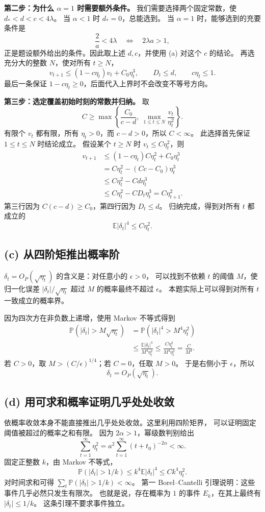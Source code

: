 \documentclass[UTF8,a4paper,11pt,fontset=fandol]{ctexart}
\newcommand{\E}{\mathbb E}
\newcommand{\Pp}{\mathbb P}
\begin{document}
\textbf{第二步：为什么 $\alpha=1$ 时需要额外条件。}
我们需要选择两个固定常数，使 $d_*<d<c<4\lambda$。
当 $\alpha<1$ 时 $d_*=0$，总能选到。
当 $\alpha=1$ 时，能够选到的充要条件是
\[
 \frac2a<4\lambda\quad\Longleftrightarrow\quad2\lambda a>1,
\]
正是题设额外给出的条件。因此取上述 $d,c$，并使用 (a) 对这个 $c$ 的结论。
再选充分大的整数 $N$，使对所有 $t\geq N$，
\[
 v_{t+1}\leq(1-c\eta_t)v_t+C_0\eta_t^3,
 \qquad D_t\leq d,\qquad c\eta_t\leq1.
\]
最后一条保证 $1-c\eta_t\geq0$，后面代入上界时不会改变不等号方向。

\textbf{第三步：选定覆盖初始时刻的常数并归纳。}
取
\[
 C\geq\max\left\{\frac{C_0}{c-d},\
                 \max_{1\leq t\leq N}\frac{v_t}{\eta_t^2}\right\}.
\]
有限个 $v_t$ 都有限，所有 $\eta_t>0$，而 $c-d>0$，所以 $C<\infty$。
此选择首先保证 $1\leq t\leq N$ 时结论成立。
假设某个 $t\geq N$ 时 $v_t\leq C\eta_t^2$，则
\begin{align*}
 v_{t+1}
 &\leq(1-c\eta_t)C\eta_t^2+C_0\eta_t^3\\
 &=C\eta_t^2-(Cc-C_0)\eta_t^3\\
 &\leq C\eta_t^2-Cd\eta_t^3\\
 &\leq C\eta_t^2-CD_t\eta_t^3=C\eta_{t+1}^2.
\end{align*}
第三行因为 $C(c-d)\geq C_0$，第四行因为 $D_t\leq d$。
归纳完成，得到对所有 $t$ 都成立的
\[
 \boxed{\E|\delta_t|^4\leq C\eta_t^2.}
\]

\subsection*{(c) 从四阶矩推出概率阶}
$\delta_t=O_P(\sqrt{\eta_t})$ 的含义是：对任意小的 $\epsilon>0$，
可以找到不依赖 $t$ 的阈值 $M$，使归一化误差
$|\delta_t|/\sqrt{\eta_t}$ 超过 $M$ 的概率最终不超过 $\epsilon$。
本题实际上可以得到对所有 $t$ 一致成立的概率界。

因为四次方在非负数上递增，使用 Markov 不等式得到
\begin{align*}
 \Pp(|\delta_t|>M\sqrt{\eta_t})
 &=\Pp(|\delta_t|^4>M^4\eta_t^2)\\
 &\leq\frac{\E|\delta_t|^4}{M^4\eta_t^2}
 \leq\frac{C\eta_t^2}{M^4\eta_t^2}=\frac C{M^4}.
\end{align*}
若 $C>0$，取 $M>(C/\epsilon)^{1/4}$；若 $C=0$，任取 $M>0$。
于是右侧小于 $\epsilon$，所以
\[
 \boxed{\delta_t=O_P(\sqrt{\eta_t}).}
\]

\subsection*{(d) 用可求和概率证明几乎处处收敛}
依概率收敛本身不能直接推出几乎处处收敛。这里利用四阶矩界，
可以证明固定阈值被超过的概率之和有限。
因为 $2\alpha>1$，幂级数判别给出
\[
 \sum_{t=1}^\infty\eta_t^2
 =a^2\sum_{t=1}^\infty(t+t_0)^{-2\alpha}<\infty.
\]
固定正整数 $k$，由 Markov 不等式，
\[
 \Pp(|\delta_t|>1/k)
 \leq k^4\E|\delta_t|^4\leq Ck^4\eta_t^2.
\]
对时间求和可得 $\sum_t\Pp(|\delta_t|>1/k)<\infty$。
第一 Borel--Cantelli 引理说明：这些事件几乎必然只发生有限次。
也就是说，存在概率为 $1$ 的事件 $E_k$，在其上最终有 $|\delta_t|\leq1/k$。
这条引理不要求事件独立。
\end{document}

